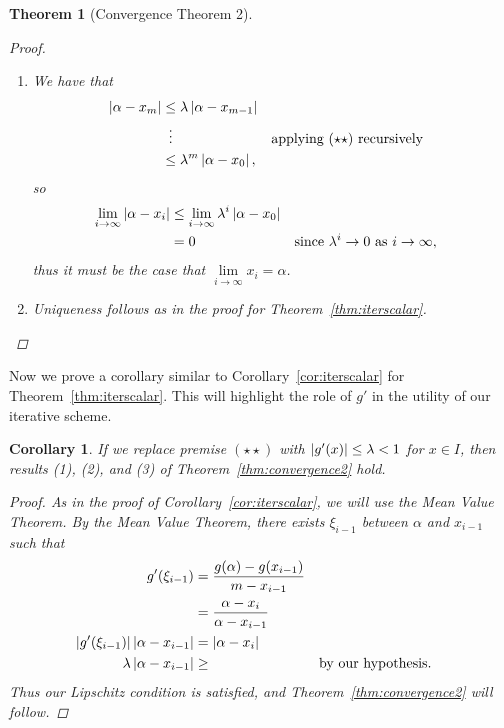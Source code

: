 \documentclass[12pt,letterpaper,DIV=11]{scrartcl}
\theoremstyle{plain}
\newtheorem{theorem}{Theorem}[section]
\newtheorem{corollary}{Corollary}
\theoremstyle{definition}
\theoremstyle{remark}
\begin{document}
\begin{theorem}[Convergence Theorem 2]
\begin{proof}
\begin{enumerate}
      \item We have that \begin{align*}
          \abs{\alpha - x_m} &\leq \lambda \abs{\alpha - x_{m - 1}} \\
                             &\vdotswithin{\leq} && \text{applying $(\star\star)$ recursively} \\
                             &\leq \lambda^m \abs{\alpha - x_0},
          \end{align*} so \begin{align*}
          \lim_{i \to \infty} \left\lvert\alpha - x_i\right\rvert &\leq \lim_{i \to \infty} \lambda^i \left\lvert\alpha - x_0\right\rvert \\
                                                 &= 0 && \text{since $\lambda^i \to 0$ as $i \to \infty$},
        \end{align*} thus it must be the case that $\lim\limits_{i \to \infty} x_i = \alpha$.

      \item Uniqueness follows as in the proof for Theorem~\ref{thm:iterscalar}.
        \qedhere
    \end{enumerate}
  \end{proof}
\end{theorem}
Now we prove a corollary similar to Corollary~\ref{cor:iterscalar} for Theorem~\ref{thm:iterscalar}.
This will highlight the role of $g'$ in the utility of our iterative scheme.
\begin{corollary}\label{cor:upperboundg'}
  If we replace premise $(\star\star)$ with $\left\lvert g'(x)\right\rvert \leq \lambda < 1$ for $x \in I$, then results (1), (2), and (3) of Theorem~\ref{thm:convergence2} hold.
  \begin{proof}
    As in the proof of Corollary~\ref{cor:iterscalar}, we will use the Mean Value Theorem.
    By the Mean Value Theorem, there exists $\xi_{i - 1}$ between $\alpha$ and $x_{i - 1}$ such that \begin{align*}
      g'(\xi_{i - 1}) &= \frac{g(\alpha) - g(x_{i - 1})}{m - x_{i - 1}} \\
                      &= \frac{\alpha - x_i}{\alpha - x_{i - 1}} \\
      \left\lvert g'(\xi_{i - 1})\right\rvert \left\lvert\alpha - x_{i - 1}\right\rvert &= \left\lvert\alpha - x_i\right\rvert \\
      \lambda \left\lvert\alpha - x_{i - 1}\right\rvert &\geq  && \text{by our hypothesis.}
    \end{align*}
    Thus our Lipschitz condition is satisfied, and Theorem~\ref{thm:convergence2} will follow.
  \end{proof}
\end{corollary}
\end{document}

